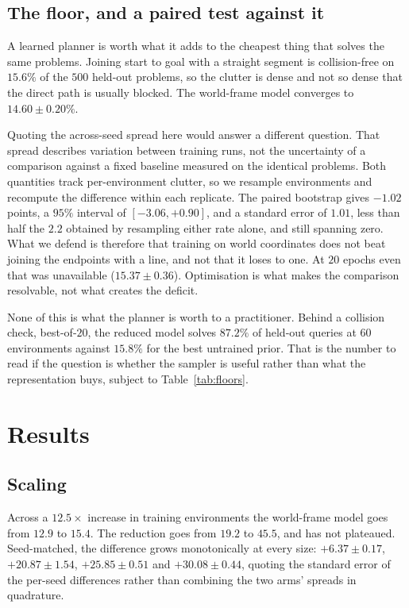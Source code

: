 \documentclass[10pt,twocolumn,letterpaper]{article}
\begin{document}
\subsection{The floor, and a paired test against it}
A learned planner is worth what it adds to the cheapest thing that solves the
same problems. Joining start to goal with a straight segment is collision-free on
$15.6\%$ of the $500$ held-out problems, so the clutter is dense and not so dense
that the direct path is usually blocked. The world-frame model converges to
$14.60 \pm 0.20\%$.

Quoting the across-seed spread here would answer a different question. That
spread describes variation between training runs, not the uncertainty of a
comparison against a fixed baseline measured on the identical problems. Both
quantities track per-environment clutter, so we resample environments and
recompute the difference within each replicate. The paired bootstrap gives
$-1.02$ points, a $95\%$ interval of $[-3.06, +0.90]$, and a standard error of
$1.01$, less than half the $2.2$ obtained by resampling either rate alone, and
still spanning zero. What we defend is therefore that training on world
coordinates does not beat joining the endpoints with a line, and not that it
loses to one. At $20$ epochs even that was unavailable ($15.37 \pm 0.36$).
Optimisation is what makes the comparison resolvable, not what creates the
deficit.

None of this is what the planner is worth to a practitioner. Behind a collision
check, best-of-$20$, the reduced model solves $87.2\%$ of held-out queries at $60$
environments against $15.8\%$ for the best untrained prior. That is the number to
read if the question is whether the sampler is useful rather than what the
representation buys, subject to Table~\ref{tab:floors}.

\section{Results}
\label{sec:results}
\subsection{Scaling}
\label{sec:scaling}
Across a $12.5\times$ increase in training environments the world-frame model
goes from $12.9$ to $15.4$. The reduction goes from $19.2$ to $45.5$, and has
not plateaued. Seed-matched, the difference grows
monotonically at every size: $+6.37 \pm 0.17$, $+20.87 \pm 1.54$,
$+25.85 \pm 0.51$ and $+30.08 \pm 0.44$, quoting the standard error of the
per-seed differences rather than combining the two arms' spreads in quadrature.
\end{document}

